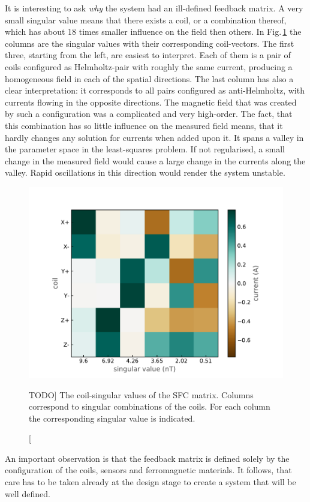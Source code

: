 It is interesting to ask \emph{why} the system had an ill-defined feedback matrix. A very small singular value means that there exists a coil, or a combination thereof, which has about 18 times smaller influence on the field then others. In Fig.\,\ref{fig:nEDM_SFC_svd} the columns are the singular values with their corresponding coil-vectors. The first three, starting from the left, are easiest to interpret. Each of them is a pair of coils configured as Helmholtz-pair with roughly the same current, producing a homogeneous field in each of the spatial directions.
The last column has also a clear interpretation: it corresponds to all pairs configured as anti-Helmholtz, with currents flowing in the opposite directions. The magnetic field that was created by such a configuration was a complicated and very high-order. The fact, that this combination has so little influence on the measured field means, that it hardly changes any solution for currents when added upon it. It spans a valley in the parameter space in the least-squares problem. If not regularised, a small change in the measured field would cause a large change in the currents along the valley. Rapid oscillations in this direction would render the system unstable.

\begin{figure}
  \centering
  \includegraphics[width=.7\linewidth]{gfx/nEDM_SFC/coil-singular_vectors_of_the_nEDM_SFC_matrix}
  \caption
  [TODO]
  {The coil-singular values of the SFC matrix. Columns correspond to singular combinations of the coils. For each column the corresponding singular value is indicated.}
  \label{fig:nEDM_SFC_svd}
\end{figure}

An important observation is that the feedback matrix is defined solely by the configuration of the coils, sensors and ferromagnetic materials. It follows, that care has to be taken already at the design stage to create a system that will be well defined.


